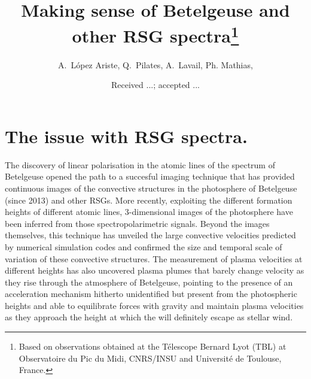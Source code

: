 \documentclass{/Users/art2/TeX/aanda/aa}
\begin{document}
 


   \title{Making sense of Betelgeuse and other RSG spectra\thanks{Based on observations obtained at the T\'elescope Bernard Lyot
(TBL) at Observatoire du Pic du Midi, CNRS/INSU and Universit\'e de
Toulouse, France.}}

   \author{{ A.~L{\'o}pez Ariste}, { Q.~Pilates},{ A.~Lavail},{ Ph. Mathias},  }
   \date{Received ...; accepted ...}

   

 
  \abstract
  {}
   {}
   {}
   { }
   {}
  
   \keywords{}


   \maketitle
%

\section{The issue with RSG spectra.}
The discovery of linear polarisation in the atomic lines of the spectrum of Betelgeuse \cite{}  opened the path to a succesful imaging technique 
that has provided continuous images of the convective structures in the photosphere of Betelgeuse (since 2013) and other RSGs. More recently, exploiting 
the different formation heights of different atomic lines, 3-dimensional images of the photosphere have been inferred from those spectropolarimetric 
signals. Beyond the images themselves, this technique has unveiled the large convective velocities predicted by numerical simulation codes and confirmed 
the size and temporal scale of variation of these convective structures. The measurement of plasma velocities at different heights has also uncovered 
plasma plumes that barely change velocity as they rise through the atmosphere of Betelgeuse, pointing to the presence of an acceleration mechanism 
hitherto unidentified but present from the photospheric heights and able to equilibrate forces with gravity and maintain plasma velocities as 
they approach the height at which the will definitely escape as stellar wind.
\end{document}
